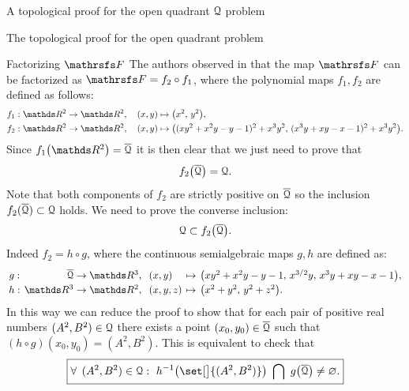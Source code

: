 \documentclass[11pt, a4paper, english, twoside, notitlepage, openright]{report}
\begin{document}
\begin{chapter}{A topological proof for the open quadrant $\mathcal{Q}$ problem}
\begin{section}{The topological proof for the open quadrant problem}

\begin{subsection}{Factorizing $\FFF$}
The authors observed in \cite[Section 3]{fgu} that the map $\FFF$ can be factorized as $\FFF=f_2\circ f_1$, where the polynomial maps $f_1, f_2$ are defined as follows:
\begin{align*}
&f_1:\R^2\to\R^2,\quad (x,y)\mapsto\big(x^2,\,y^2\big),\\
&f_2:\R^2\to\R^2,\quad (x,y)\mapsto\big((xy^2+x^2y-y-1)^2+x^3y^2,\,(x^3y+xy-x-1)^2+x^3y^2\big).
\end{align*}
Since $f_1\big(\R^2\big)=\overline{\Qu}$ it is then clear that we just need to prove that
\begin{equation}
f_2\big(\overline{\mathcal{Q}}\big)=\mathcal{Q}.
\end{equation}
Note that both components of $f_2$ are strictly positive on $\overline{\mathcal{Q}}$ so the inclusion $f_2(\overline{\mathcal{Q}})\subset\mathcal{Q}$ holds. We need to prove the converse inclusion:
\begin{equation}\label{mainTop}
\mathcal{Q}\subset f_2\big(\overline{\mathcal{Q}}\big).
\end{equation}
Indeed $f_2=h\circ g$, where the continuous semialgebraic maps $g, h$ are defined as:
$$
\arraycolsep=2pt\def\arraystretch{1.2}
\begin{array}{crlcl}
g:&\overline{\Qu}\to\R^3,&\ (x,y)&\mapsto&\big(xy^2+x^2y-y-1,\,x^{3/2}y,\,x^3y+xy-x-1\big),\\
h:&\R^3\to\R^2,&\ (x,y,z)&\mapsto&\big(x^2+y^2,\,y^2+z^2\big).\\
\end{array}
$$
In this way we can reduce the proof to show that for each pair of positive real numbers $(A^2,B^2)\in\mathcal{Q}$ there exists a point $(x_0,y_0)\in\overline{\mathcal{Q}}$ such that $(h\circ g)(x_0,y_0)=(A^2,B^2)$. This is equivalent to check that
\begin{equation*}
\boxed{
\forall\, \,  (A^2,B^2)\in\Qu:\ h^{-1}\big(\set[\big]{(A^2,B^2)}\big)\ \bigcap\ g\big(\overline{\Qu}\big)\ne\varnothing.
}
\end{equation*}


\end{subsection}
\end{section}
\end{chapter}
\end{document}

